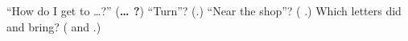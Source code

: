 \begin{tcolorbox}[breakable,colback=teal!4,colframe=teal!35!black,title={Before you move on}]
\textquotedblleft{}How do I get to …?\textquotedblright{} (\textbf{…   ?}) \textquotedblleft{}Turn\textquotedblright{}? (\textbf{}.) \textquotedblleft{}Near the shop\textquotedblright{}? (\textbf{ }.) Which letters did \textbf{} and \textbf{} bring? (\textbf{} and \textbf{}.)
\end{tcolorbox}
